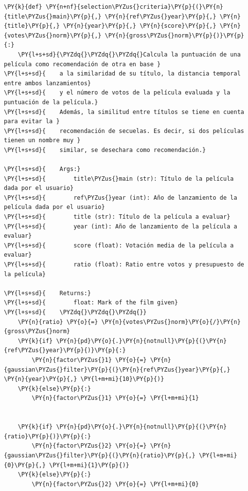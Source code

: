     \begin{tcolorbox}[breakable, size=fbox, boxrule=1pt, pad at break*=1mm,colback=cellbackground, colframe=cellborder]
\begin{Verbatim}[commandchars=\\\{\}]
\PY{k}{def} \PY{n+nf}{selection\PYZus{}criteria}\PY{p}{(}\PY{n}{title\PYZus{}main}\PY{p}{,} \PY{n}{ref\PYZus{}year}\PY{p}{,} \PY{n}{title}\PY{p}{,} \PY{n}{year}\PY{p}{,} \PY{n}{score}\PY{p}{,} \PY{n}{votes\PYZus{}norm}\PY{p}{,} \PY{n}{gross\PYZus{}norm}\PY{p}{)}\PY{p}{:}
    \PY{l+s+sd}{\PYZdq{}\PYZdq{}\PYZdq{}Calcula la puntuación de una película como recomendación de otra en base }
\PY{l+s+sd}{    a la similaridad de su título, la distancia temporal entre ambos lanzamientos}
\PY{l+s+sd}{    y el número de votos de la película evaluada y la puntuación de la película.}
\PY{l+s+sd}{    Además, la similitud entre títulos se tiene en cuenta para evitar la }
\PY{l+s+sd}{    recomendación de secuelas. Es decir, si dos películas tienen un nombre muy }
\PY{l+s+sd}{    similar, se desechara como recomendación.}

\PY{l+s+sd}{    Args:}
\PY{l+s+sd}{        title\PYZus{}main (str): Título de la película dada por el usuario}
\PY{l+s+sd}{        ref\PYZus{}year (int): Año de lanzamiento de la película dada por el usuario}
\PY{l+s+sd}{        title (str): Título de la película a evaluar}
\PY{l+s+sd}{        year (int): Año de lanzamiento de la película a evaluar}
\PY{l+s+sd}{        score (float): Votación media de la película a evaluar}
\PY{l+s+sd}{        ratio (float): Ratio entre votos y presupuesto de la película}

\PY{l+s+sd}{    Returns:}
\PY{l+s+sd}{        float: Mark of the film given}
\PY{l+s+sd}{    \PYZdq{}\PYZdq{}\PYZdq{}}
    \PY{n}{ratio} \PY{o}{=} \PY{n}{votes\PYZus{}norm}\PY{o}{/}\PY{n}{gross\PYZus{}norm}
    \PY{k}{if} \PY{n}{pd}\PY{o}{.}\PY{n}{notnull}\PY{p}{(}\PY{n}{ref\PYZus{}year}\PY{p}{)}\PY{p}{:}
        \PY{n}{factor\PYZus{}1} \PY{o}{=} \PY{n}{gaussian\PYZus{}filter}\PY{p}{(}\PY{n}{ref\PYZus{}year}\PY{p}{,} \PY{n}{year}\PY{p}{,} \PY{l+m+mi}{10}\PY{p}{)}
    \PY{k}{else}\PY{p}{:}
        \PY{n}{factor\PYZus{}1} \PY{o}{=} \PY{l+m+mi}{1}        


    \PY{k}{if} \PY{n}{pd}\PY{o}{.}\PY{n}{notnull}\PY{p}{(}\PY{n}{ratio}\PY{p}{)}\PY{p}{:}
        \PY{n}{factor\PYZus{}2} \PY{o}{=} \PY{n}{gaussian\PYZus{}filter}\PY{p}{(}\PY{n}{ratio}\PY{p}{,} \PY{l+m+mi}{0}\PY{p}{,} \PY{l+m+mi}{1}\PY{p}{)}
    \PY{k}{else}\PY{p}{:}
        \PY{n}{factor\PYZus{}2} \PY{o}{=} \PY{l+m+mi}{0}


\end{Verbatim}
\end{tcolorbox}
